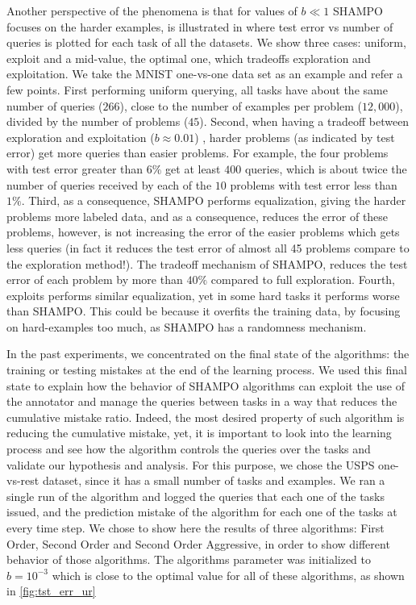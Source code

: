 Another perspective of the phenomena is that for values of $b\ll 1$ SHAMPO focuses on the harder 
examples, is illustrated in  where test error vs number of queries is plotted for each 
task of all the datasets. We show three cases: uniform, exploit and a mid-value, the optimal one, which 
tradeoffs exploration and exploitation. We take the MNIST one-vs-one data set as an example and 
refer a few points. First performing uniform querying, all 
tasks have about the same number of queries ($266$), close to the number of examples per problem 
($12,000$), divided by the number of problems ($45$). Second, when having a tradeoff between exploration 
and exploitation ($b\approx 0.01$) , harder problems (as indicated by test error) get more queries than easier problems. 
For example, the four problems with test error greater than $6\%$ get at least $400$ queries, which is 
about twice the number of queries received by each of the $10$ problems with test error less than $1\%$. 
Third, as a consequence, SHAMPO performs equalization, giving the harder problems more labeled data, 
and as a consequence, reduces the error of these problems, however, is not increasing the error of the 
easier problems which gets less queries (in fact it reduces the test error of almost all 45 problems compare 
to the exploration method!). 
The tradeoff mechanism of SHAMPO, reduces the test error of each problem by more than $40\%$ 
compared to full exploration. Fourth, exploits performs similar equalization, yet in some hard tasks it 
performs worse than SHAMPO. This could be because it overfits the training data, by focusing on 
hard-examples too much, as SHAMPO has a randomness mechanism.

In the past experiments, we concentrated on the final state of the algorithms: 
the training or testing mistakes at the end of the learning process. We used 
this final state to explain how the behavior of SHAMPO algorithms can exploit the use of the annotator and 
manage the queries between tasks in a way that reduces the cumulative mistake ratio. Indeed, the most desired 
property of such algorithm is reducing the cumulative mistake, yet, it is important to
look into the learning process and see how the algorithm controls the queries 
over the tasks and validate our hypothesis and analysis. For this purpose, we chose the USPS one-vs-rest dataset, since it has a small number of 
tasks and examples. We ran a single run of the algorithm and logged the 
queries that each one of the tasks issued, and the prediction mistake of the 
algorithm for each one of the tasks at every time step. We chose to show here the 
results of three algorithms: First Order, Second Order and Second Order Aggressive, in order to show 
different behavior of those algorithms. The algorithms parameter was initialized to $b=10^{-3}$ 
which is close to the optimal value for all of these algorithms, as shown in \eqref{fig:tst_err_ur}

